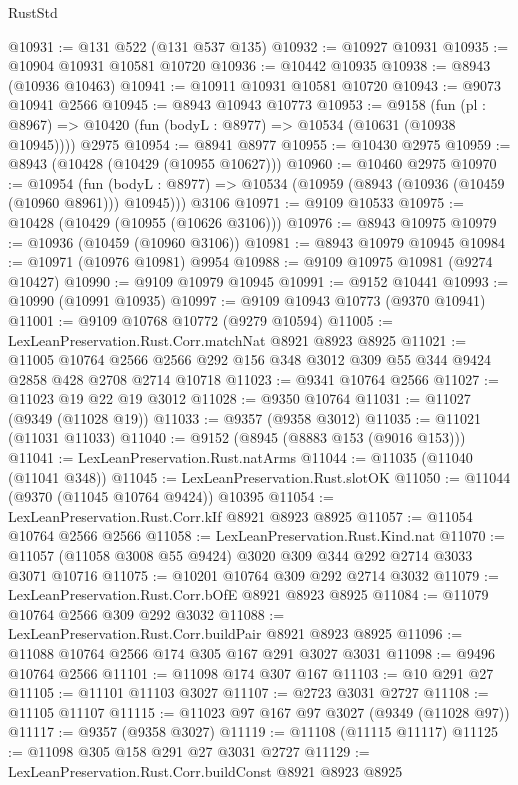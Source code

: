 \begin{lexlean}{RustStd}
\begin{coremodule}
{\begin{coremodule}
{{{{{{{{{{{{{{{{{{{{{{{{{{{{{{{{{{{{{{{@10931 := @131 @522 (@131 @537 @135)
@10932 := @10927 @10931
@10935 := @10904 @10931 @10581 @10720
@10936 := @10442 @10935
@10938 := @8943 (@10936 @10463)
@10941 := @10911 @10931 @10581 @10720
@10943 := @9073 @10941 @2566
@10945 := @8943 @10943 @10773
@10953 := @9158
    (fun (pl : @8967) => @10420 (fun (bodyL : @8977) => @10534 (@10631 (@10938 @10945))))
    @2975
@10954 := @8941 @8977
@10955 := @10430 @2975
@10959 := @8943 (@10428 (@10429 (@10955 @10627)))
@10960 := @10460 @2975
@10970 := @10954
    (fun (bodyL : @8977) => @10534 (@10959 (@8943 (@10936 (@10459 (@10960 @8961))) @10945)))
    @3106
@10971 := @9109 @10533
@10975 := @10428 (@10429 (@10955 (@10626 @3106)))
@10976 := @8943 @10975
@10979 := @10936 (@10459 (@10960 @3106))
@10981 := @8943 @10979 @10945
@10984 := @10971 (@10976 @10981) @9954
@10988 := @9109 @10975 @10981 (@9274 @10427)
@10990 := @9109 @10979 @10945
@10991 := @9152 @10441
@10993 := @10990 (@10991 @10935)
@10997 := @9109 @10943 @10773 (@9370 @10941)
@11001 := @9109 @10768 @10772 (@9279 @10594)
@11005 := LexLeanPreservation.Rust.Corr.matchNat @8921 @8923 @8925
@11021 := @11005
    @10764
    @2566
    @2566
    @292
    @156
    @348
    @3012
    @309
    @55
    @344
    @9424
    @2858
    @428
    @2708
    @2714
    @10718
@11023 := @9341 @10764 @2566
@11027 := @11023 @19 @22 @19 @3012
@11028 := @9350 @10764
@11031 := @11027 (@9349 (@11028 @19))
@11033 := @9357 (@9358 @3012)
@11035 := @11021 (@11031 @11033)
@11040 := @9152 (@8945 (@8883 @153 (@9016 @153)))
@11041 := LexLeanPreservation.Rust.natArms
@11044 := @11035 (@11040 (@11041 @348))
@11045 := LexLeanPreservation.Rust.slotOK
@11050 := @11044 (@9370 (@11045 @10764 @9424)) @10395
@11054 := LexLeanPreservation.Rust.Corr.kIf @8921 @8923 @8925
@11057 := @11054 @10764 @2566 @2566
@11058 := LexLeanPreservation.Rust.Kind.nat
@11070 := @11057 (@11058 @3008 @55 @9424) @3020 @309 @344 @292 @2714 @3033 @3071 @10716
@11075 := @10201 @10764 @309 @292 @2714 @3032
@11079 := LexLeanPreservation.Rust.Corr.bOfE @8921 @8923 @8925
@11084 := @11079 @10764 @2566 @309 @292 @3032
@11088 := LexLeanPreservation.Rust.Corr.buildPair @8921 @8923 @8925
@11096 := @11088 @10764 @2566 @174 @305 @167 @291 @3027 @3031
@11098 := @9496 @10764 @2566
@11101 := @11098 @174 @307 @167
@11103 := @10 @291 @27
@11105 := @11101 @11103 @3027
@11107 := @2723 @3031 @2727
@11108 := @11105 @11107
@11115 := @11023 @97 @167 @97 @3027 (@9349 (@11028 @97))
@11117 := @9357 (@9358 @3027)
@11119 := @11108 (@11115 @11117)
@11125 := @11098 @305 @158 @291 @27 @3031 @2727
@11129 := LexLeanPreservation.Rust.Corr.buildConst @8921 @8923 @8925
}}}}}}}}}}}}}}}}}}}}}}}}}}}}}}}}}}}}}}}
\end{coremodule}}
\end{coremodule}
\end{lexlean}
